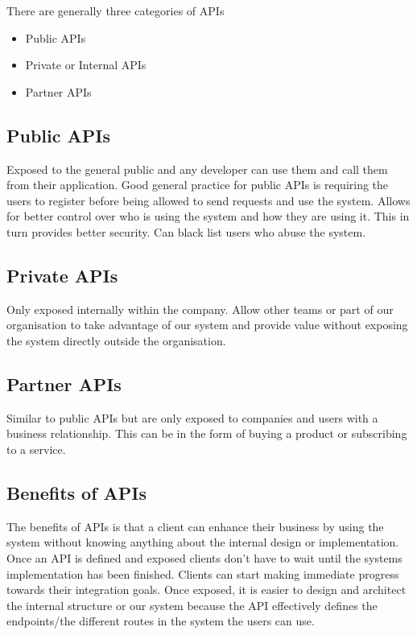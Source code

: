 \documentclass[a4paper, 11pt]{book}
\begin{document}
    There are generally three categories of APIs

    \begin{itemize}
        \item Public APIs
        \item Private or Internal APIs
        \item Partner APIs
    \end{itemize}

    \subsection{Public APIs}
    Exposed to the general public and any developer can use them and call them from their application.
    Good general practice for public APIs is requiring the users to register before being allowed to send requests and use the system.
    Allows for better control over who is using the system and how they are using it.
    This in turn provides better security.
    Can black list users who abuse the system.

    \subsection{Private APIs}
    Only exposed internally within the company.
    Allow other teams or part of our organisation to take advantage of our system and provide value without exposing the system directly outside the organisation.

    \subsection{Partner APIs}
    Similar to public APIs but are only exposed to companies and users with a business relationship.
    This can be in the form of buying a product or subscribing to a service.

    \subsection{Benefits of APIs}
    The benefits of APIs is that a client can enhance their business by using the system without knowing anything about the internal design or implementation.
    Once an API is defined and exposed clients don't have to wait until the systems implementation has been finished.
    Clients can start making immediate progress towards their integration goals.
    Once exposed, it is easier to design and architect the internal structure or our system because the API effectively defines the endpoints/the different routes in the system the users can use.
\end{document}

